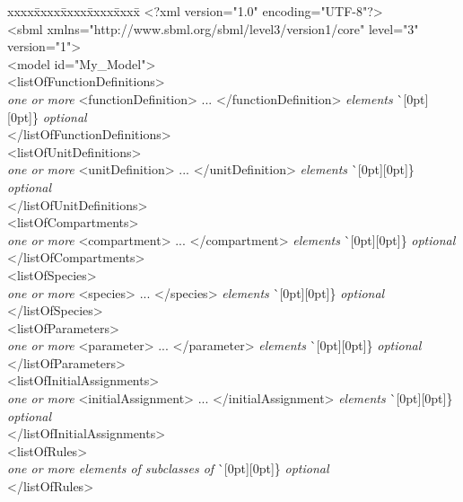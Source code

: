 \newcommand{\sayOptional}{\raisebox{0pt}[0pt][0pt]{\bigg\} \textrm{\emph{optional}}}}

\vspace*{2ex}
\begin{tt}
  \tightspacing
  \small
  \begin{tabbing}
xxxx\=xxxx\=xxxx\=xxxx\=xxxx\=\kill
\+\>
<?xml version="1.0" encoding="UTF-8"?>\\
<sbml xmlns="http://www.sbml.org/sbml/level3/version1/core" level="3" version="1">\\
\><model id="My\_Model">\\
\>\><listOfFunctionDefinitions>\\
\>\>\>\textrm{\emph{one or more}} <functionDefinition> ... </functionDefinition> \textrm{\emph{elements}}  \` \sayOptional\\
\>\></listOfFunctionDefinitions>\\
\>\><listOfUnitDefinitions>\\
\>\>\>\textrm{\emph{one or more}} <unitDefinition> ... </unitDefinition> \textrm{\emph{elements}}  \` \sayOptional\\
\>\></listOfUnitDefinitions>\\
\>\><listOfCompartments>\\
\>\>\>\textrm{\emph{one or more}} <compartment> ... </compartment> \textrm{\emph{elements}}  \` \sayOptional\\
\>\></listOfCompartments>\\
\>\><listOfSpecies>\\
\>\>\>\textrm{\emph{one or more}} <species> ... </species> \textrm{\emph{elements}}  \` \sayOptional\\
\>\></listOfSpecies>\\
\>\><listOfParameters>\\
\>\>\>\textrm{\emph{one or more}} <parameter> ... </parameter> \textrm{\emph{elements}}  \` \sayOptional\\
\>\></listOfParameters>\\
\>\><listOfInitialAssignments>\\
\>\>\>\textrm{\emph{one or more}} <initialAssignment> ... </initialAssignment> \textrm{\emph{elements}}  \` \sayOptional\\
\>\></listOfInitialAssignments>\\
\>\><listOfRules>\\
\>\>\>\textrm{\emph{one or more elements of subclasses of }}  \` \sayOptional\\
\>\></listOfRules>\\

\end{tabbing}
\end{tt}
